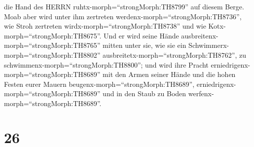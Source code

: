 die Hand des HERRN ruhtx-morph=``strongMorph:TH8799'' auf diesem Berge.
Moab aber wird unter ihm zertreten werdenx-morph=``strongMorph:TH8736'',
wie Stroh zertreten wirdx-morph=``strongMorph:TH8738'' und wie
Kotx-morph=``strongMorph:TH8675''.  Und er wird seine Hände
ausbreitenx-morph=``strongMorph:TH8765'' mitten unter sie, wie sie ein
Schwimmerx-morph=``strongMorph:TH8802''
ausbreitetx-morph=``strongMorph:TH8762'', zu
schwimmenx-morph=``strongMorph:TH8800''; und wird ihre Pracht
erniedrigenx-morph=``strongMorph:TH8689'' mit den Armen seiner Hände
 und die hohen Festen eurer Mauern
beugenx-morph=``strongMorph:TH8689'',
erniedrigenx-morph=``strongMorph:TH8689'' und in den Staub zu Boden
werfenx-morph=``strongMorph:TH8689''.

\hypertarget{section-25}{%
\section{26}\label{section-25}}

